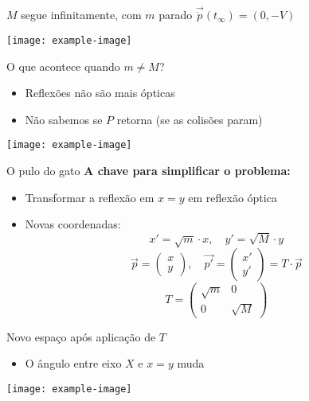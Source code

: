 \documentclass{beamer}
\begin{document}
\begin{frame}{$M$ segue infinitamente, com $m$ parado}
$\vec{\dot p}(t_{\infty}) = (0,-V)$

\texttt{[image: example-image]}
\end{frame}

\begin{frame}{O que acontece quando $m \neq M$?}
\begin{itemize}
  \item Reflexões não são mais ópticas
  \item Não sabemos se $P$ retorna (se as colisões param)
\end{itemize}

\texttt{[image: example-image]}
\end{frame}

\begin{frame}{O pulo do gato}
\textbf{A chave para simplificar o problema:}
\begin{itemize}
  \item Transformar a reflexão em $x = y$ em reflexão óptica
  \item Novas coordenadas:
  \[
  x' = \sqrt{m} \cdot x,\quad y' = \sqrt{M} \cdot y
  \]
  \[
  \vec{p} = \begin{pmatrix} x \\ y \end{pmatrix},\quad
  \vec{p'} = \begin{pmatrix} x' \\ y' \end{pmatrix} = T \cdot \vec{p}
  \]
  \[
  T = \begin{pmatrix} \sqrt{m} & 0 \\ 0 & \sqrt{M} \end{pmatrix}
  \]
\end{itemize}
\end{frame}

\begin{frame}{Novo espaço após aplicação de $T$}
\begin{itemize}
  \item O ângulo entre eixo $X$ e $x=y$ muda
\end{itemize}

\texttt{[image: example-image]}
\end{frame}
\end{document}
